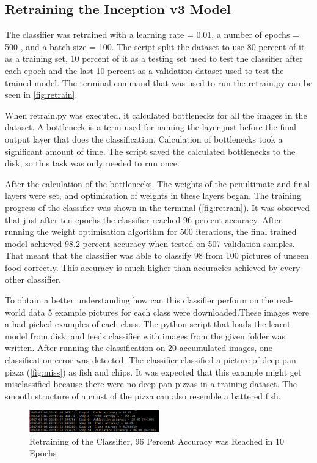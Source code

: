 \subsection{ Retraining the Inception v3 Model}

The classifier was retrained with a learning rate = 0.01, a number of epochs = 500 , and a batch size = 100. The script split the dataset to use 80 percent of it as a training set, 10 percent of it as a testing set used to test the classifier after each epoch and the last 10 percent as a validation dataset used to test the trained model. The terminal command that was used to run the retrain.py can be seen in \autoref{fig:retrain}.

When retrain.py was executed, it calculated bottlenecks for all the images in the dataset. A bottleneck is a term used for naming the layer just before the final output layer that does the classification. Calculation of bottlenecks took a significant amount of time. The script saved the calculated bottlenecks to the disk, so this task was only needed to run once.

After the calculation of the bottlenecks. The weights of the penultimate and final layers were set, and optimisation of weights in these layers began. The training progress of the classifier was shown in the terminal (\autoref{fig:retrain}). It was observed that just after ten epochs the classifier reached 96 percent accuracy.  After running the weight optimisation algorithm for 500 iterations, the final trained model achieved 98.2 percent accuracy when tested on 507 validation samples. That meant that the classifier was able to classify 98 from 100 pictures of unseen food correctly.  This accuracy is much higher than accuracies achieved by every other classifier.

To obtain a better understanding how can this classifier perform on the real-world data 5 example pictures for each class were downloaded.These images were a had picked examples of each class. The python script that loads the learnt model from disk, and feeds classifier with images from the given folder was written. After running the classification on 20 accumulated images, one classification error was detected. The classifier classified a picture of deep pan pizza (\autoref{fig:miss}) as fish and chips. It was expected that this example might get misclassified because there were no deep pan pizzas in a training dataset. The smooth structure of a crust of the pizza can also resemble a battered fish. 


\begin{figure}[h]
\centering
\includegraphics[width=0.5\textwidth]{Figures/4/term-train.PNG}
\caption{Retraining  of the Classifier, 96 Percent Accuracy was Reached in  10 Epochs}
\label{fig:retrain-2}
\end{figure}

